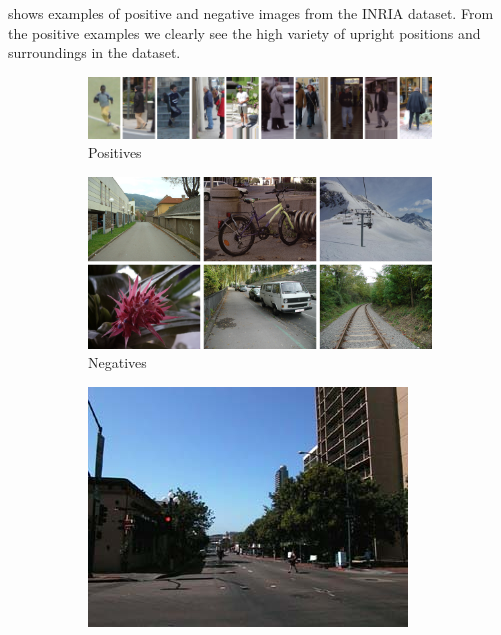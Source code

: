 \documentclass[thesis.tex]{subfiles}
\begin{document}
 shows examples of positive  and negative  images from the INRIA dataset. From the positive examples we clearly see the high variety of upright positions and surroundings in the dataset.

\begin{figure}[p]
	\centering
	\begin{subfigure}[t]{\textwidth}
		\includegraphics[width=\textwidth]{img/inriaPositives.png}
		\caption{Positives}
		\label{fig:inriaPositives}
		\vspace{2mm}
	\end{subfigure}
	\begin{subfigure}[t]{\textwidth}
		\includegraphics[width=\textwidth]{img/inriaNegatives.png}
		\caption{Negatives}
		\label{fig:inriaNegatives}
	\end{subfigure}
	\caption{Example INRIA images.}
	\label{fig:inriaExampleImages}
	\vspace{1cm}
	\begin{subfigure}[t]{0.495\textwidth}
		\includegraphics[width=\textwidth]{img/inriaManExample1.png}

\end{subfigure}
\end{figure}
\end{document}
